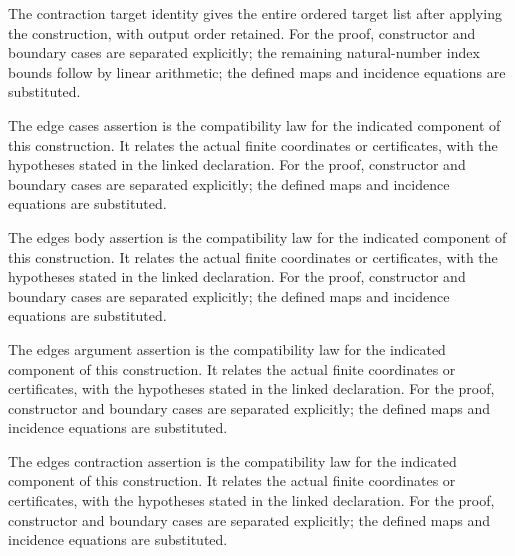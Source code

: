 The contraction target identity gives the entire ordered target list after applying the construction, with output order retained.
For the proof, constructor and boundary cases are separated explicitly; the remaining natural-number index bounds follow by linear arithmetic; the defined maps and incidence equations are substituted.
\par{}

The edge cases assertion is the compatibility law for the indicated component of this construction. It relates the actual finite coordinates or certificates, with the hypotheses stated in the linked declaration.
For the proof, constructor and boundary cases are separated explicitly; the defined maps and incidence equations are substituted.
\par{}

The edges body assertion is the compatibility law for the indicated component of this construction. It relates the actual finite coordinates or certificates, with the hypotheses stated in the linked declaration.
For the proof, constructor and boundary cases are separated explicitly; the defined maps and incidence equations are substituted.
\par{}

The edges argument assertion is the compatibility law for the indicated component of this construction. It relates the actual finite coordinates or certificates, with the hypotheses stated in the linked declaration.
For the proof, constructor and boundary cases are separated explicitly; the defined maps and incidence equations are substituted.
\par{}

The edges contraction assertion is the compatibility law for the indicated component of this construction. It relates the actual finite coordinates or certificates, with the hypotheses stated in the linked declaration.
For the proof, constructor and boundary cases are separated explicitly; the defined maps and incidence equations are substituted.
\par{}

